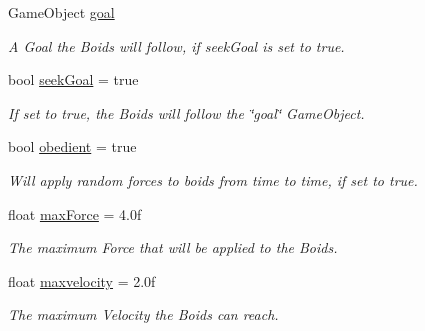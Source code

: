 \begin{DoxyCompactItemize}
\mbox{\label{class_f_unit_manager_a43c285fed4df2253698b2f9e472e3add}} 
Game\+Object \hyperlink{class_f_unit_manager_a43c285fed4df2253698b2f9e472e3add}{goal}
\begin{DoxyCompactList}\small\item\em A Goal the Boids will follow, if seek\+Goal is set to true. \end{DoxyCompactList}\item 
\mbox{\label{class_f_unit_manager_a79d01dac80c57300f39750b6f6d920eb}} 
bool \hyperlink{class_f_unit_manager_a79d01dac80c57300f39750b6f6d920eb}{seek\+Goal} = true
\begin{DoxyCompactList}\small\item\em If set to true, the Boids will follow the \char`\"{}goal\char`\"{} Game\+Object. \end{DoxyCompactList}\item 
\mbox{\label{class_f_unit_manager_ae2bb63f32195acc71f88cdf7c656fd44}} 
bool \hyperlink{class_f_unit_manager_ae2bb63f32195acc71f88cdf7c656fd44}{obedient} = true
\begin{DoxyCompactList}\small\item\em Will apply random forces to boids from time to time, if set to true. \end{DoxyCompactList}\item 
\mbox{\label{class_f_unit_manager_a120a66886a707186f5d8de29d4d4fcba}} 
float \hyperlink{class_f_unit_manager_a120a66886a707186f5d8de29d4d4fcba}{max\+Force} = 4.\+0f
\begin{DoxyCompactList}\small\item\em The maximum Force that will be applied to the Boids. \end{DoxyCompactList}\item 
\mbox{\label{class_f_unit_manager_acf8af35dd5ba76af298dd14a941116cd}} 
float \hyperlink{class_f_unit_manager_acf8af35dd5ba76af298dd14a941116cd}{maxvelocity} = 2.\+0f
\begin{DoxyCompactList}\small\item\em The maximum Velocity the Boids can reach. \end{DoxyCompactList}\item 
\mbox{\label{class_f_unit_manager_a6fffed9f8949e5908b5ff789779b8abb}} 

\end{DoxyCompactItemize}
